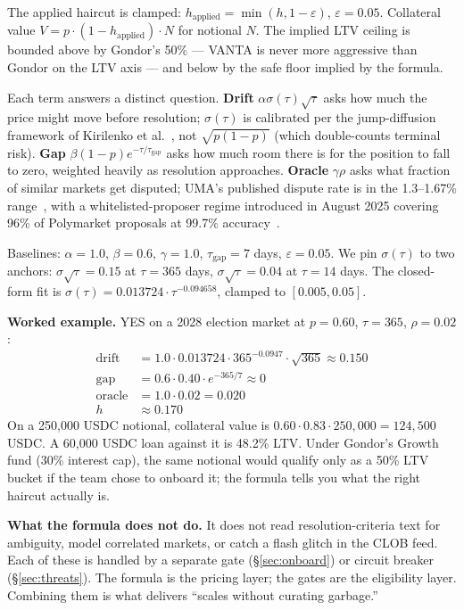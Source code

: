 \documentclass[11pt,letterpaper]{article}
\begin{document}
The applied haircut is clamped: $h_{\mathrm{applied}} = \min(h, 1 - \varepsilon)$, $\varepsilon = 0.05$. Collateral value $V = p \cdot (1 - h_{\mathrm{applied}}) \cdot N$ for notional $N$. The implied LTV ceiling is bounded above by Gondor's 50\% --- VANTA is never more aggressive than Gondor on the LTV axis --- and below by the safe floor implied by the formula.

Each term answers a distinct question. \textbf{Drift} $\alpha \sigma(\tau) \sqrt{\tau}$ asks how much the price might move before resolution; $\sigma(\tau)$ is calibrated per the jump-diffusion framework of Kirilenko et al.~\cite{kirilenko2025}, not $\sqrt{p(1-p)}$ (which double-counts terminal risk). \textbf{Gap} $\beta(1-p)e^{-\tau/\tau_{\mathrm{gap}}}$ asks how much room there is for the position to fall to zero, weighted heavily as resolution approaches. \textbf{Oracle} $\gamma \rho$ asks what fraction of similar markets get disputed; UMA's published dispute rate is in the 1.3--1.67\% range~\cite{uma-disputes}, with a whitelisted-proposer regime introduced in August 2025 covering 96\% of Polymarket proposals at 99.7\% accuracy~\cite{uma-managed}.

Baselines: $\alpha = 1.0$, $\beta = 0.6$, $\gamma = 1.0$, $\tau_{\mathrm{gap}} = 7$ days, $\varepsilon = 0.05$. We pin $\sigma(\tau)$ to two anchors: $\sigma\sqrt{\tau} = 0.15$ at $\tau = 365$ days, $\sigma\sqrt{\tau} = 0.04$ at $\tau = 14$ days. The closed-form fit is $\sigma(\tau) = 0.013724 \cdot \tau^{-0.094658}$, clamped to $[0.005, 0.05]$.

\textbf{Worked example.} YES on a 2028 election market at $p=0.60$, $\tau=365$, $\rho=0.02$:
\begin{align*}
\text{drift} &= 1.0 \cdot 0.013724 \cdot 365^{-0.0947} \cdot \sqrt{365} \approx 0.150 \\
\text{gap}   &= 0.6 \cdot 0.40 \cdot e^{-365/7} \approx 0 \\
\text{oracle}&= 1.0 \cdot 0.02 = 0.020 \\
h            &\approx 0.170
\end{align*}
On a 250{,}000 USDC notional, collateral value is $0.60 \cdot 0.83 \cdot 250{,}000 = 124{,}500$ USDC. A 60{,}000 USDC loan against it is 48.2\% LTV. Under Gondor's Growth fund (30\% interest cap), the same notional would qualify only as a 50\% LTV bucket if the team chose to onboard it; the formula tells you what the right haircut actually is.

\textbf{What the formula does not do.} It does not read resolution-criteria text for ambiguity, model correlated markets, or catch a flash glitch in the CLOB feed. Each of these is handled by a separate gate (\S\ref{sec:onboard}) or circuit breaker (\S\ref{sec:threats}). The formula is the pricing layer; the gates are the eligibility layer. Combining them is what delivers ``scales without curating garbage.''
\end{document}
